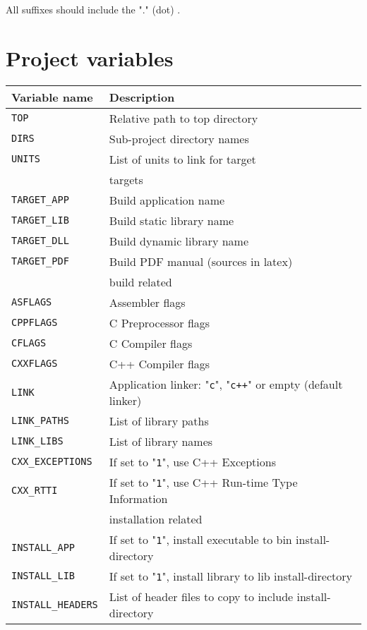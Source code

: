 \documentclass{article}
\newcommand{\var}[1]{{\tt #1}}
\newcommand{\val}[1]{"{\tt #1}"}
\begin{document}
All suffixes should include the "." (dot) .

\section{Project variables}

\begin{tabular}{ll}
Variable name              & Description                       \\
\hline
\var{TOP}		   & Relative path to top directory    \\
\var{DIRS}		   & Sub-project directory names       \\
\var{UNITS}                & List of units to link for target      \\
\hline
& targets \\
\hline
\var{TARGET\_APP}           & Build application name              \\
\var{TARGET\_LIB}           & Build static library name           \\
\var{TARGET\_DLL}           & Build dynamic library name          \\
\var{TARGET\_PDF}	   & Build PDF manual (sources in latex) \\
\hline
& build related \\
\hline
\var{ASFLAGS}              & Assembler flags \\
\var{CPPFLAGS}		   & C Preprocessor flags \\
\var{CFLAGS}		   & C Compiler flags \\
\var{CXXFLAGS}		   & C++ Compiler flags \\
\var{LINK}                 & Application linker: \val{c}, \val{c++} or empty (default linker)\\
\var{LINK\_PATHS}	   & List of library paths \\
\var{LINK\_LIBS}	   & List of library names \\
\var{CXX\_EXCEPTIONS}      & If set to \val{1}, use C++ Exceptions                \\
\var{CXX\_RTTI}       	   & If set to \val{1}, use C++ Run-time Type Information \\
\hline
& installation related \\
\hline
\var{INSTALL\_APP}	   & If set to \val{1}, install executable to bin install-directory \\
\var{INSTALL\_LIB}	   & If set to \val{1}, install library to lib install-directory \\
\var{INSTALL\_HEADERS}    & List of header files to copy to include install-directory \\
\end{tabular}
\end{document}
